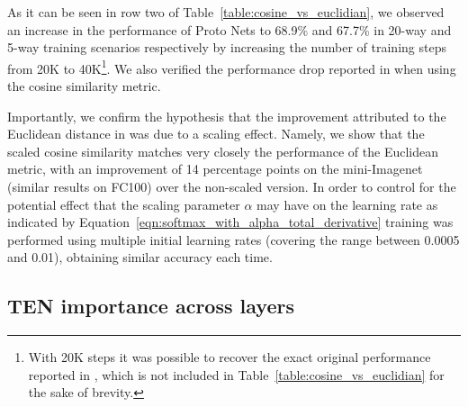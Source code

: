 \documentclass{article}
\begin{document}
As it can be seen in row two of Table~\ref{table:cosine_vs_euclidian}, we observed an increase in the performance of Proto Nets \citep{snell2017prototypical} to 68.9\% and 67.7\% in 20-way and 5-way training scenarios respectively by increasing the number of training steps from 20K to 40K\footnote{With 20K steps it was possible to recover the exact original performance reported in \citet{snell2017prototypical}, which is not included in Table~\ref{table:cosine_vs_euclidian} for the sake of brevity.}. We also verified the performance drop reported in \citep{snell2017prototypical} when using the cosine similarity metric. 

Importantly, we confirm the hypothesis that the improvement attributed to the Euclidean distance in \cite{snell2017prototypical} was due to a scaling effect. Namely, we show that the scaled cosine similarity matches very closely the performance of the Euclidean metric, with an improvement of 14 percentage points on the mini-Imagenet (similar results on FC100) over the non-scaled version. In order to control for the potential effect that the scaling parameter $\alpha$ may have on the learning rate as indicated by Equation~\eqref{eqn:softmax_with_alpha_total_derivative} training was performed using multiple initial learning rates (covering the range between 0.0005 and 0.01), obtaining similar accuracy each time. 

\subsection{TEN importance across layers} \label{ssec:tbn_importance_vs_depth}
\end{document}

